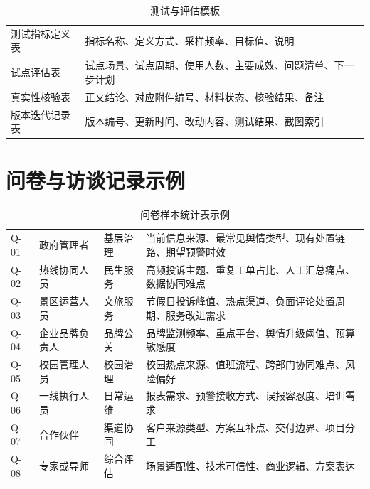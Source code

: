 \begin{table}[htbp]
	\centering
	\caption{测试与评估模板}
	\begin{tabularx}{\textwidth}{|L{3.2cm}Y|}
		\hline
		 &                  \\
		\hline
		测试指标定义表        & 指标名称、定义方式、采样频率、目标值、说明          \\
		试点评估表          & 试点场景、试点周期、使用人数、主要成效、问题清单、下一步计划 \\
		真实性核验表         & 正文结论、对应附件编号、材料状态、核验结果、备注       \\
		版本迭代记录表        & 版本编号、更新时间、改动内容、测试结果、截图索引       \\
		\hline
	\end{tabularx}
\end{table}

\section{问卷与访谈记录示例}

\begin{table}[htbp]
	\centering
	\caption{问卷样本统计表示例}
	\begin{tabularx}{\textwidth}{|L{1.8cm}L{2.4cm}L{2.4cm}Y|}
		\hline
		 &  &  &              \\
		\hline
		Q-01           & 政府管理者          & 基层治理           & 当前信息来源、最常见舆情类型、现有处置链路、期望预警时效 \\
		Q-02           & 热线协同人员         & 民生服务           & 高频投诉主题、重复工单占比、人工汇总痛点、数据协同难点  \\
		Q-03           & 景区运营人员         & 文旅服务           & 节假日投诉峰值、热点渠道、负面评论处置周期、服务改进需求 \\
		Q-04           & 企业品牌负责人        & 品牌公关           & 品牌监测频率、重点平台、舆情升级阈值、预算敏感度     \\
		Q-05           & 校园管理人员         & 校园治理           & 校园热点来源、值班流程、跨部门协同难点、风险偏好     \\
		Q-06           & 一线执行人员         & 日常运维           & 报表需求、预警接收方式、误报容忍度、培训需求       \\
		Q-07           & 合作伙伴           & 渠道协同           & 客户来源类型、方案互补点、交付边界、项目分工       \\
		Q-08           & 专家或导师          & 综合评估           & 场景适配性、技术可信性、商业逻辑、方案表达        \\
		\hline
	\end{tabularx}
\end{table}

